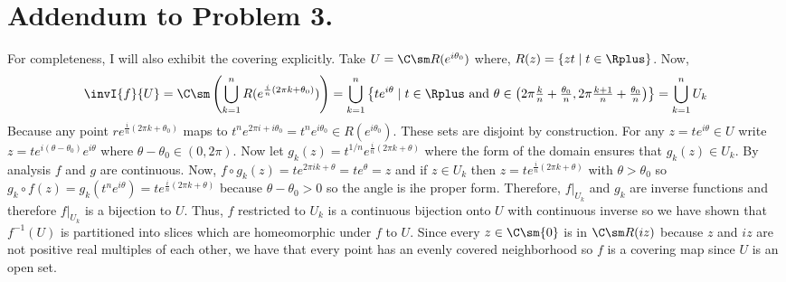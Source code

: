 \documentclass[12pt]{extarticle}
\begin{document}
\section*{Addendum to Problem 3.}
For completeness, I will also exhibit the covering explicitly. Take $U = \C \sm R(e^{i\theta_0})$ where, $R(z) = \{zt \mid t \in \Rplus\}$. Now, 
\[\invI{f}{U} = \C \sm \left( \bigcup_{k = 1}^n R(e^{\frac{i}{n}(2 \pi k + \theta_0)}) \right) = \bigcup_{k = 1}^n \left\{ t e^{i \theta} \mid t \in \Rplus \text{ and } \theta \in \left(2 \pi \tfrac{k}{n} + \tfrac{\theta_0}{n}, 2 \pi \tfrac{k + 1}{n} + \tfrac{\theta_0}{n} \right) \right\} = \bigcup_{k = 1}^n U_k  \]
Because any point $r e^{\frac{i}{n}(2 \pi k + \theta_0)}$ maps to $t^n e^{2 \pi i + i \theta_0} = t^n e^{i \theta_0} \in R(e^{i \theta_0})$. These sets are disjoint by construction. For any $z = t e^{i \theta} \in U$ write $z = t e^{i (\theta - \theta_0)} e^{i \theta}$ where $\theta - \theta_0 \in (0, 2\pi)$. Now let $g_k(z) = t^{1/n} e^{\frac{i}{n}(2 \pi k + \theta)}$ where the form of the domain ensures that $g_k(z) \in U_k$. By analysis $f$ and $g$ are continuous. Now, $f \circ g_k(z) = t e^{2 \pi i k + \theta} = t e^{\theta} = z$ and if $z \in U_k$ then $z = t e^{\frac{i}{n}(2 \pi k + \theta)}$ with $\theta > \theta_0$ so $g_k \circ f(z) = g_k(t^n e^{i \theta}) = t e^{\frac{i}{n}(2 \pi k + \theta)}$ because $\theta - \theta_0 > 0$ so the angle is ihe proper form. Therefore, $f|_{U_k}$ and $g_k$ are inverse functions and therefore $f|_{U_k}$ is a bijection to $U$. Thus, $f$ restricted to $U_k$ is a continuous bijection onto $U$ with continuous inverse so we have shown that $f^{-1}(U)$ is partitioned into slices which are homeomorphic under $f$ to $U$. Since every $z \in \C \sm \{0\}$ is in $\C \sm R(i z)$ because $z$ and $iz$ are not positive real multiples of each other, we have that every point has an evenly covered neighborhood so $f$ is a covering map since $U$ is an open set.  
\end{document}
